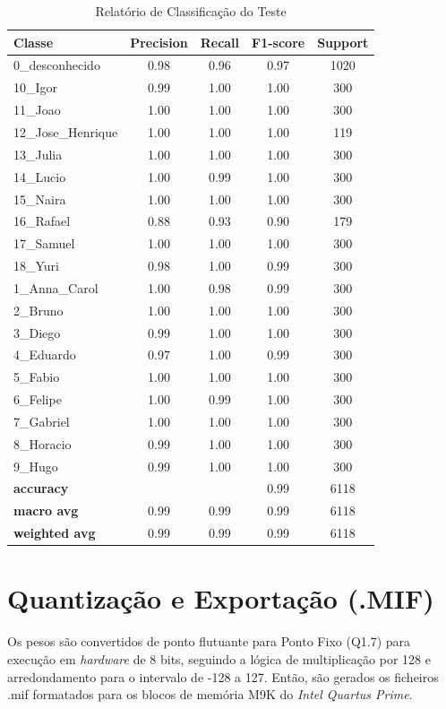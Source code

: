 \begin{table}[H]
\centering
\caption{Relatório de Classificação do Teste}
\label{tab:relatorio_classificacao}
\begin{tabular}{l c c c c}
\toprule
\textbf{Classe} & \textbf{Precision} & \textbf{Recall} & \textbf{F1-score} & \textbf{Support} \\
\midrule
0\_desconhecido    & 0.98 & 0.96 & 0.97 & 1020 \\
10\_Igor           & 0.99 & 1.00 & 1.00 & 300  \\
11\_Joao           & 1.00 & 1.00 & 1.00 & 300  \\
12\_Jose\_Henrique & 1.00 & 1.00 & 1.00 & 119  \\
13\_Julia          & 1.00 & 1.00 & 1.00 & 300  \\
14\_Lucio          & 1.00 & 0.99 & 1.00 & 300  \\
15\_Naira          & 1.00 & 1.00 & 1.00 & 300  \\
16\_Rafael         & 0.88 & 0.93 & 0.90 & 179  \\
17\_Samuel         & 1.00 & 1.00 & 1.00 & 300  \\
18\_Yuri           & 0.98 & 1.00 & 0.99 & 300  \\
1\_Anna\_Carol     & 1.00 & 0.98 & 0.99 & 300  \\
2\_Bruno           & 1.00 & 1.00 & 1.00 & 300  \\
3\_Diego           & 0.99 & 1.00 & 1.00 & 300  \\
4\_Eduardo         & 0.97 & 1.00 & 0.99 & 300  \\
5\_Fabio           & 1.00 & 1.00 & 1.00 & 300  \\
6\_Felipe          & 1.00 & 0.99 & 1.00 & 300  \\
7\_Gabriel         & 1.00 & 1.00 & 1.00 & 300  \\
8\_Horacio         & 0.99 & 1.00 & 1.00 & 300  \\
9\_Hugo            & 0.99 & 1.00 & 1.00 & 300  \\
\midrule
\textbf{accuracy}     &      &      & 0.99 & 6118 \\
\textbf{macro avg}    & 0.99 & 0.99 & 0.99 & 6118 \\
\textbf{weighted avg} & 0.99 & 0.99 & 0.99 & 6118 \\
\bottomrule
\end{tabular}
\end{table}

\section{Quantização e Exportação (.MIF)}
Os pesos são convertidos de ponto flutuante para Ponto Fixo (Q1.7) para execução em \textit{hardware} de 8 bits, seguindo a lógica de multiplicação por 128 e arredondamento para o intervalo de -128 a 127. Então, são gerados os ficheiros .mif formatados para os blocos de memória M9K do \textit{Intel Quartus Prime}.
